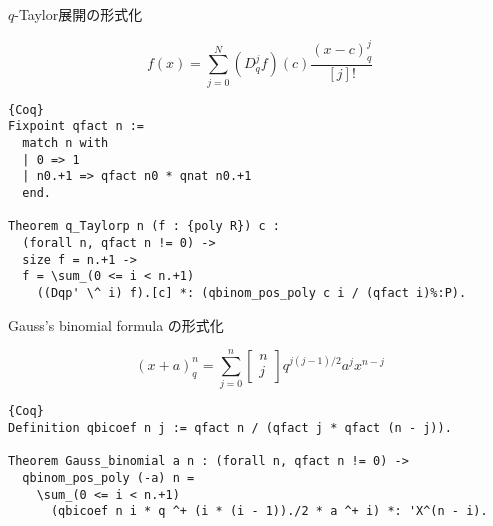 \documentclass[dvipdfmx,cjk]{beamer}
\theoremstyle{mystyle}
\newcommand{\qcoe}[2]{\left[\begin{array}{ccc}#1\\#2\end{array}\right]}
\newcommand{\0}{\textbf{0}}
\begin{document}

\begin{frame}[fragile]{$q$-Taylor展開の形式化}
	\begin{screen}
		\[
			f(x) = \sum_{j=0}^N (D_q^jf)(c)\frac{(x-c)^j_q}{[j]!}
		\]
	\end{screen} \pause
	\begin{lstlisting}{Coq}
Fixpoint qfact n :=
  match n with
  | 0 => 1
  | n0.+1 => qfact n0 * qnat n0.+1
  end.

Theorem q_Taylorp n (f : {poly R}) c :
  (forall n, qfact n != 0) ->
  size f = n.+1 ->
  f = \sum_(0 <= i < n.+1)
    ((Dqp' \^ i) f).[c] *: (qbinom_pos_poly c i / (qfact i)%:P).
\end{lstlisting}
\end{frame}

\begin{frame}[fragile]{Gauss's binomial formula の形式化}
	\begin{screen}
		\[
			(x + a)^n_q = \sum_{j = 0}^n \qcoe{n}{j} q^{j (j - 1)/2} a^j x^{n - j}
		\]
	\end{screen} \pause
	\begin{lstlisting}{Coq}
Definition qbicoef n j := qfact n / (qfact j * qfact (n - j)).

Theorem Gauss_binomial a n : (forall n, qfact n != 0) ->
  qbinom_pos_poly (-a) n =
    \sum_(0 <= i < n.+1)
      (qbicoef n i * q ^+ (i * (i - 1))./2 * a ^+ i) *: 'X^(n - i). \end{lstlisting}
\end{frame}
\end{document}
